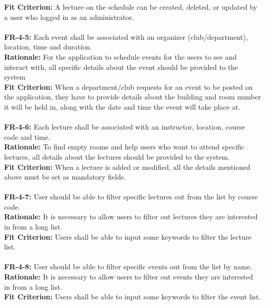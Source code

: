 \documentclass[12pt]{article}
\begin{document}
    \textbf{Fit Criterion:} A lecture on the schedule can be created, deleted, or updated by a user who logged in as an administrator.\\\\
    \textbf{FR-4-5:} Each event shall be associated with an organizer (club/department), location, time and duration.\\
    \textbf{Rationale:} For the application to schedule events for the users to see and interact with, all specific details about the event should be provided to the system\\
    \textbf{Fit Criterion:} When a department/club requests for an event to be posted on the application, they have to provide details about the building and room number it will be held in, along with the date and time the event will take place at.\\\\
    \textbf{FR-4-6:} Each lecture shall be associated with an instructor, location, course code and time.\\
    \textbf{Rationale:} To find empty rooms and help users who want to attend specific lectures, all details about the lectures should be provided to the system.\\
    \textbf{Fit Criterion:} When a lecture is added or modified, all the details mentioned above must be set as mandatory fields.\\\\
    \textbf{FR-4-7:} User should be able to filter specific lectures out from the list by course code.\\
    \textbf{Rationale:} It is necessary to allow users to filter out lectures they are interested in from a long list.\\
    \textbf{Fit Criterion:} Users shall be able to input some keywords to filter the lecture list.\\\\
    \textbf{FR-4-8:} User should be able to filter specific events out from the list by name.\\
    \textbf{Rationale:} It is necessary to allow users to filter out events they are interested in from a long list.\\
    \textbf{Fit Criterion:} Users shall be able to input some keywords to filter the event list.\\\\
\end{document}
